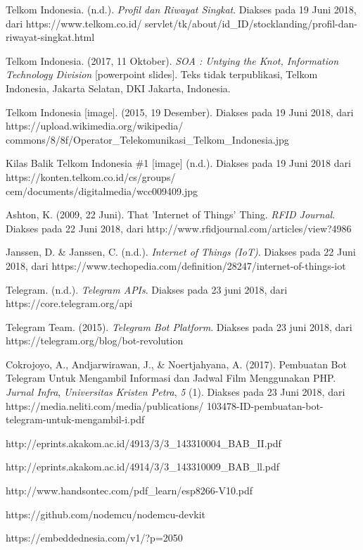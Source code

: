 \begin{thebibliography}{9}
	
	Telkom Indonesia. (n.d.). \textit{Profil dan Riwayat Singkat}. Diakses pada 19 Juni 2018, dari  https://www.telkom.co.id/ servlet/tk/about/id\_ID/stocklanding/profil-dan-riwayat-singkat.html
	
	Telkom Indonesia. (2017, 11 Oktober). \textit{SOA : Untying the Knot, Information Technology Division} [powerpoint slides]. Teks tidak terpublikasi, Telkom Indonesia, Jakarta Selatan, DKI Jakarta, Indonesia. 
	

	Telkom Indonesia [image]. (2015, 19 Desember). Diakses pada 19 Juni 2018, dari https://upload.wikimedia.org/wikipedia/ commons/8/8f/Operator\_Telekomunikasi\_Telkom\_Indonesia.jpg
	

	Kilas Balik Telkom Indonesia \#1 [image] (n.d.). Diakses pada 19 Juni 2018 dari https://konten.telkom.co.id/cs/groups/ cem/documents/digitalmedia/wcc009409.jpg
	
	Ashton, K. (2009, 22 Juni). That 'Internet of Things' Thing. \textit{RFID Journal}. Diakses pada 22 Juni 2018, dari http://www.rfidjournal.com/articles/view?4986
	

	Janssen, D. \& Janssen, C. (n.d.). \textit{Internet of Things (IoT)}. Diakses pada 22 Juni 2018, dari https://www.techopedia.com/definition/28247/internet-of-things-iot
	

	Telegram. (n.d.). \textit{Telegram APIs}. Diakses pada 23 juni 2018, dari https://core.telegram.org/api
	

	Telegram Team. (2015). \textit{Telegram Bot Platform}. Diakses pada 23 juni 2018, dari https://telegram.org/blog/bot-revolution
	

	Cokrojoyo, A., Andjarwirawan, J., \&  Noertjahyana, A. (2017). Pembuatan Bot Telegram Untuk Mengambil Informasi dan Jadwal Film Menggunakan PHP. \textit{Jurnal Infra}, \textit{Universitas Kristen Petra}, \textit{5} (1). Diakses pada 23 Juni 2018, dari https://media.neliti.com/media/publications/ 103478-ID-pembuatan-bot-telegram-untuk-mengambil-i.pdf
	
	http://eprints.akakom.ac.id/4913/3/3\_143310004\_BAB\_II.pdf
	
	http://eprints.akakom.ac.id/4914/3/3\_143310009\_BAB\_ll.pdf 
	
	http://www.handsontec.com/pdf\_learn/esp8266-V10.pdf
	
	https://github.com/nodemcu/nodemcu-devkit
	
	https://embeddednesia.com/v1/?p=2050
\end{thebibliography}

